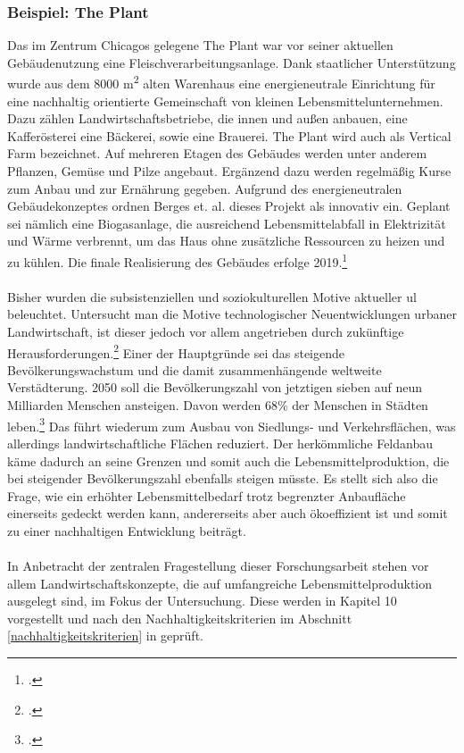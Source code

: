 \documentclass{scrartcl}
\begin{document}
\subsubsection*{Beispiel: The Plant}
Das im Zentrum Chicagos gelegene The Plant war vor seiner aktuellen Gebäudenutzung eine Fleischverarbeitungsanlage. Dank staatlicher Unterstützung wurde aus dem 8000 m\textsuperscript{2} alten Warenhaus eine energieneutrale Einrichtung für eine nachhaltig orientierte Gemeinschaft von kleinen Lebensmittelunternehmen. Dazu zählen Landwirtschaftsbetriebe, die innen und außen anbauen, eine Kafferösterei eine Bäckerei, sowie eine Brauerei. The Plant wird auch als Vertical Farm bezeichnet. Auf mehreren Etagen des Gebäudes werden unter anderem Pflanzen, Gemüse und Pilze angebaut. Ergänzend dazu werden regelmäßig Kurse zum Anbau und zur Ernährung gegeben. Aufgrund des energieneutralen Gebäudekonzeptes ordnen Berges et. al. dieses Projekt als innovativ ein. Geplant sei nämlich eine Biogasanlage, die ausreichend Lebensmittelabfall in Elektrizität und Wärme verbrennt, um das Haus ohne zusätzliche Ressourcen zu heizen und zu kühlen. Die finale Realisierung des Gebäudes erfolge 2019.\footcites[Vgl.][S.18]{Al-Kodmany2018TheCity}{TheLLC}\\
\\
Bisher wurden die subsistenziellen und soziokulturellen Motive aktueller \acs{ul} beleuchtet. Untersucht man die Motive technologischer Neuentwicklungen urbaner Landwirtschaft, ist dieser jedoch vor allem angetrieben durch zukünftige Herausforderungen.\footcites[Vgl.][S.238]{Germer2011SkyfarmingSecurity}[sowie][S.6]{PeterMollerVoss2013VerticalRise}[][S.1]{Al-Kodmany2018TheCity} Einer der Hauptgründe sei das steigende Bevölkerungswachstum und die damit zusammenhängende weltweite Verstädterung. 2050 soll die Bevölkerungszahl von jetztigen sieben auf neun Milliarden Menschen ansteigen. Davon werden 68\% der Menschen in Städten leben.\footcite[Vgl.][S.3]{UnitedNationsDepartmentofEconomicandSocialAffairs2017World2017} Das führt wiederum zum Ausbau von Siedlungs- und Verkehrsflächen, was allerdings landwirtschaftliche Flächen reduziert. Der herkömmliche Feldanbau käme dadurch an seine Grenzen und somit auch die Lebensmittelproduktion, die bei steigender Bevölkerungszahl ebenfalls steigen müsste. Es stellt sich also die Frage, wie ein erhöhter Lebensmittelbedarf trotz begrenzter Anbaufläche einerseits gedeckt werden kann, andererseits aber auch ökoeffizient ist und somit zu einer nachhaltigen Entwicklung beiträgt. 
\\
\\
In Anbetracht der zentralen Fragestellung dieser Forschungsarbeit stehen vor allem Landwirtschaftskonzepte, die auf umfangreiche Lebensmittelproduktion ausgelegt sind, im Fokus der Untersuchung. Diese werden in Kapitel 10 vorgestellt und nach den Nachhaltigkeitskriterien im Abschnitt \ref{nachhaltigkeitskriterien} in geprüft.
\end{document}
